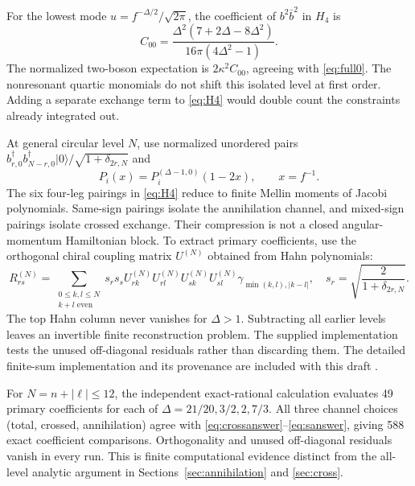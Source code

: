 \documentclass[11pt,a4paper]{article}
\numberwithin{equation}{section}
\theoremstyle{remark}\newtheorem{remark}[theorem]{Remark}
\newcommand{\kap}{\kappa}
\newcommand{\ket}[1]{|#1\rangle}
\begin{document}
For the lowest mode $u=f^{-\Delta/2}/\sqrt{2\pi}$, the coefficient of $b^2\bar b^2$ in $H_4$ is
\begin{equation}
 C_{00}=\frac{\Delta^2(7+2\Delta-8\Delta^2)}{16\pi(4\Delta^2-1)}.
\end{equation}
The normalized two-boson expectation is $2\kap^2C_{00}$, agreeing with \eqref{eq:full0}. The nonresonant quartic monomials do not shift this isolated level at first order. Adding a separate exchange term to \eqref{eq:H4} would double count the constraints already integrated out.

At general circular level $N$, use normalized unordered pairs
$b^\dagger_{r,0}b^\dagger_{N-r,0}\ket0/\sqrt{1+\delta_{2r,N}}$ and
\begin{equation}
 P_i(x)=P_i^{(\Delta-1,0)}(1-2x),\qquad x=f^{-1}.
\end{equation}
The six four-leg pairings in \eqref{eq:H4} reduce to finite Mellin moments of Jacobi polynomials. Same-sign pairings isolate the annihilation channel, and mixed-sign pairings isolate crossed exchange. Their compression is not a closed angular-momentum Hamiltonian block. To extract primary coefficients, use the orthogonal chiral coupling matrix $U^{(N)}$ obtained from Hahn polynomials:
\begin{equation}
 R^{(N)}_{rs}=\sum_{\substack{0\leq k,l\leq N\\k+l\text{ even}}}
 s_rs_sU_{rk}^{(N)}U_{rl}^{(N)}U_{sk}^{(N)}U_{sl}^{(N)}
 \gamma_{\min(k,l),|k-l|},\quad
 s_r=\sqrt{\frac2{1+\delta_{2r,N}}}.
 \label{eq:compression}
\end{equation}
The top Hahn column never vanishes for $\Delta>1$. Subtracting all earlier levels leaves an invertible finite reconstruction problem. The supplied implementation tests the unused off-diagonal residuals rather than discarding them. The detailed finite-sum implementation and its provenance are included with this draft \cite{notes}.

For $N=n+|\ell|\leq12$, the independent exact-rational calculation evaluates 49 primary coefficients for each of
$\Delta=21/20,3/2,2,7/3$. All three channel choices (total, crossed, annihilation) agree with \eqref{eq:crossanswer}--\eqref{eq:sanswer}, giving 588 exact coefficient comparisons. Orthogonality and unused off-diagonal residuals vanish in every run. This is finite computational evidence distinct from the all-level analytic argument in Sections~\ref{sec:annihilation} and \ref{sec:cross}.
\end{document}
